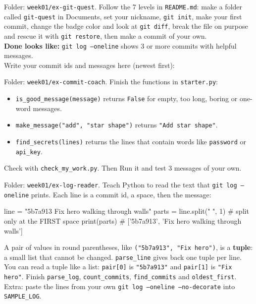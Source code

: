 \begin{exercise}
Folder: \texttt{week01/ex-git-quest}. Follow the 7 levels in \texttt{README.md}: make a folder called \texttt{git-quest} in Documents, set your nickname, \texttt{git init}, make your first commit, change the badge color and look at \texttt{git diff}, break the file on purpose and rescue it with \texttt{git restore}, then make a commit of your own.\\
\textbf{Done looks like:} \texttt{git log --oneline} shows 3 or more commits with helpful messages.\\
Write your commit ids and messages here (newest first):
\end{exercise}

\begin{exercise}
Folder: \texttt{week01/ex-commit-coach}. Finish the functions in \texttt{starter.py}:
\begin{itemize}[itemsep=1pt]
  \item \texttt{is\_good\_message(message)} returns \texttt{False} for empty, too long, boring or one-word messages.
  \item \texttt{make\_message("add", "star shape")} returns \texttt{"Add star shape"}.
  \item \texttt{find\_secrets(lines)} returns the lines that contain words like \texttt{password} or \texttt{api\_key}.
\end{itemize}
Check with \texttt{check\_my\_work.py}. Then Run it and test 3 messages of your own.
\end{exercise}

\begin{exercise}
Folder: \texttt{week01/ex-log-reader}. Teach Python to read the text that \texttt{git log --oneline} prints. Each line is a commit id, a space, then the message:
\begin{pycode}
line = "5b7a913 Fix hero walking through walls"
parts = line.split(" ", 1)   # split only at the FIRST space
print(parts)   # ['5b7a913', 'Fix hero walking through walls']
\end{pycode}
A pair of values in round parentheses, like \texttt{("5b7a913", "Fix hero")}, is a \textbf{tuple}: a small list that cannot be changed. \texttt{parse\_line} gives back one tuple per line. You can read a tuple like a list: \texttt{pair[0]} is \texttt{"5b7a913"} and \texttt{pair[1]} is \texttt{"Fix hero"}.
Finish \texttt{parse\_log}, \texttt{count\_commits}, \texttt{find\_commits} and \texttt{oldest\_first}. Extra: paste the lines from your own \texttt{git log --oneline --no-decorate} into \texttt{SAMPLE\_LOG}.
\end{exercise}

